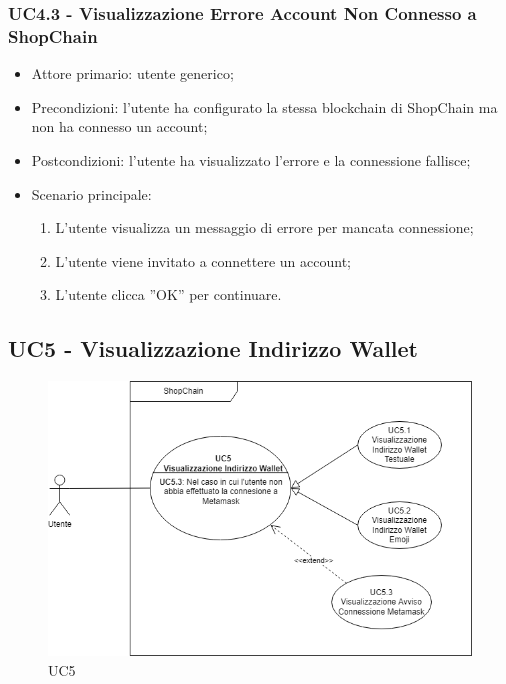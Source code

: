 \subsubsection{UC4.3 - Visualizzazione Errore Account Non Connesso a ShopChain}

\begin{itemize}
    \item Attore primario: utente generico;
    \item Precondizioni: l'utente ha configurato la stessa blockchain\glo{} di ShopChain ma non ha connesso un account;
    \item Postcondizioni: l'utente ha visualizzato l'errore e la connessione fallisce;
    \item Scenario principale:
        \begin{enumerate}
            \item L'utente visualizza un messaggio di errore per mancata connessione;
            \item L'utente viene invitato a connettere un account;
            \item L'utente clicca ”OK” per continuare.
        \end{enumerate}
\end{itemize}

\subsection{UC5 - Visualizzazione Indirizzo Wallet}\label{subsection: U5}

\begin{figure}[H]
    \centering
    \includegraphics[scale=0.7]{immagini/UC5.png}
    \caption{UC5}
\end{figure}

